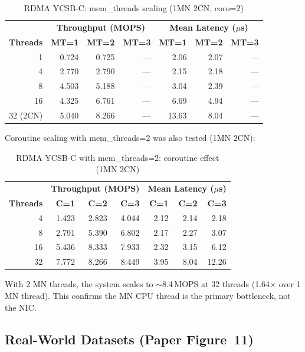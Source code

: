 \documentclass[conference]{IEEEtran}
\begin{document}
\begin{table}[H]
\centering
\caption{RDMA YCSB-C: mem\_threads scaling (1MN 2CN, coro=2)}
\label{tab:rdma-memthreads}
\small
\begin{tabular}{@{}rrrr|rrr@{}}
\toprule
& \multicolumn{3}{c|}{\textbf{Throughput (MOPS)}} & \multicolumn{3}{c}{\textbf{Mean Latency ($\mu$s)}} \\
\textbf{Threads} & \textbf{MT=1} & \textbf{MT=2} & \textbf{MT=3} & \textbf{MT=1} & \textbf{MT=2} & \textbf{MT=3} \\
\midrule
1  & 0.724  & 0.725  & ---    & 2.06  & 2.07  & --- \\
4  & 2.770  & 2.790  & ---    & 2.15  & 2.18  & --- \\
8  & 4.503  & 5.188  & ---    & 3.04  & 2.39  & --- \\
16 & 4.325  & 6.761  & ---    & 6.69  & 4.94  & --- \\
32 (2CN) & 5.040 & 8.266 & --- & 13.63 & 8.04 & --- \\
\bottomrule
\end{tabular}
\end{table}

Coroutine scaling with mem\_threads=2 was also tested (1MN 2CN):

\begin{table}[H]
\centering
\caption{RDMA YCSB-C with mem\_threads=2: coroutine effect (1MN 2CN)}
\label{tab:rdma-mt2-coro}
\small
\begin{tabular}{@{}rrrr|rrr@{}}
\toprule
& \multicolumn{3}{c|}{\textbf{Throughput (MOPS)}} & \multicolumn{3}{c}{\textbf{Mean Latency ($\mu$s)}} \\
\textbf{Threads} & \textbf{C=1} & \textbf{C=2} & \textbf{C=3} & \textbf{C=1} & \textbf{C=2} & \textbf{C=3} \\
\midrule
4  & 1.423 & 2.823 & 4.044 & 2.12 & 2.14 & 2.18 \\
8  & 2.791 & 5.390 & 6.802 & 2.17 & 2.27 & 3.07 \\
16 & 5.436 & 8.333 & 7.933 & 2.32 & 3.15 & 6.12 \\
32 & 7.772 & 8.266 & 8.449 & 3.95 & 8.04 & 12.26 \\
\bottomrule
\end{tabular}
\end{table}

With 2 MN threads, the system scales to $\sim$8.4\,MOPS at 32 threads (1.64$\times$ over 1 MN thread). This confirms the MN CPU thread is the primary bottleneck, not the NIC.

\subsection{Real-World Datasets (Paper Figure~11)}\label{sec:repro-datasets}
\end{document}

